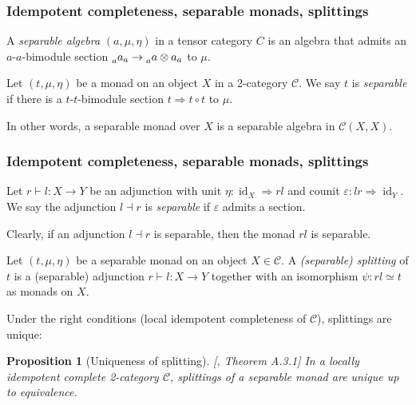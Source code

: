 \documentclass{beamer}
\newcommand{\tnsr}{\otimes}
\newcommand{\veps}{{\varepsilon}}
\DeclareMathOperator{\id}{id}
\newtheorem{proposition}[theorem]{Proposition}
\newcommand{\cC}{{\mathcal{C}}}
\begin{document}
\begin{frame}
\frametitle{Idempotent completeness, separable monads, splittings}

\pause

\begin{definition}
A \emph{separable algebra} $(a,\mu,\eta)$ in a tensor category $C$
is an algebra that admits an $a$-$a$-bimodule section
$\prescript{}{a}a_a \to \prescript{}{a}a \tnsr a_a$
to $\mu$.
\end{definition}

\pause

\begin{definition}
Let $(t, \mu, \eta)$ be a monad on an object $X$
in a 2-category $\cC$.
We say $t$ is \emph{separable} if there is a
$t$-$t$-bimodule section
$t \Rightarrow t \circ t$ to $\mu$.
\end{definition}

\pause

In other words, a separable monad over $X$
is a separable algebra in $\cC(X,X)$.

\end{frame}

\begin{frame}
\frametitle{Idempotent completeness, separable monads, splittings}

\begin{definition}
Let $r \vdash l: X \to Y$ be an adjunction
with unit $\eta: \id_X \Rightarrow rl$
and counit $\veps: lr \Rightarrow \id_Y$.
We say the adjunction $l \dashv r$ is \emph{separable}
if $\veps$ admits a section.
\end{definition}

\pause

Clearly, if an adjunction $l \dashv r$ is separable,
then the monad $rl$ is separable.

\pause

\begin{definition}
Let $(t,\mu,\eta)$ be a separable monad on
an object $X \in \cC$.
A \emph{(separable) splitting} of $t$ is a (separable) adjunction
$r \vdash l: X \to Y$
together with an isomorphism
$\psi: rl \simeq t$ as monads on $X$.
\end{definition}

\pause

Under the right conditions
(local idempotent completeness of $\cC$),
splittings are unique:

\begin{proposition}[Uniqueness of splitting]
[\cite{DRfusion}, Theorem A.3.1]
\label{p:splitting-unique}
In a locally idempotent complete 2-category $\cC$,
splittings of a separable monad are unique
up to equivalence.
\end{proposition}


\end{frame}
\end{document}
